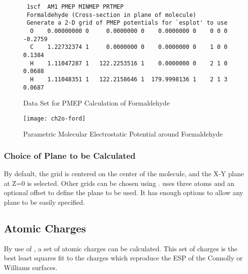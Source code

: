 \begin{figure}
\begin{makeimage}
\end{makeimage}
\begin{verbatim}
 1scf  AM1 PMEP MINMEP PRTMEP
 Formaldehyde (Cross-section in plane of molecule)
 Generate a 2-D grid of PMEP potentials for `esplot' to use
  O    0.00000000 0     0.0000000 0    0.0000000 0    0 0 0     -0.2759
  C    1.22732374 1     0.0000000 0    0.0000000 0    1 0 0      0.1384
  H    1.11047287 1   122.2253516 1    0.0000000 0    2 1 0      0.0688
  H    1.11048351 1   122.2158646 1  179.9998136 1    2 1 3      0.0687
\end{verbatim}
\caption{\label{pmepdata}Data Set for PMEP Calculation of Formaldehyde}
\end{figure}

\begin{figure}
\begin{makeimage}
\end{makeimage}
\begin{center}
\texttt{[image: ch2o-ford]}
\end{center}
\caption{\label{pmepplot}Parametric Molecular Electrostatic Potential around
Formaldehyde}
\end{figure}

\subsubsection{Choice of Plane to be Calculated}
By default, the grid is centered on the center of the molecule, and the X-Y
plane at Z=0 is selected.  Other grids can be chosen using .
 uses three atoms and an optional offset to define the plane to be
used.  It has enough options to allow any plane to be easily specified.

\subsection{Atomic Charges}
By use of , a set of atomic charges can be calculated.  This set of
charges is the best least squares fit to the charges which reproduce the ESP of
the Connolly or Williams surfaces.
